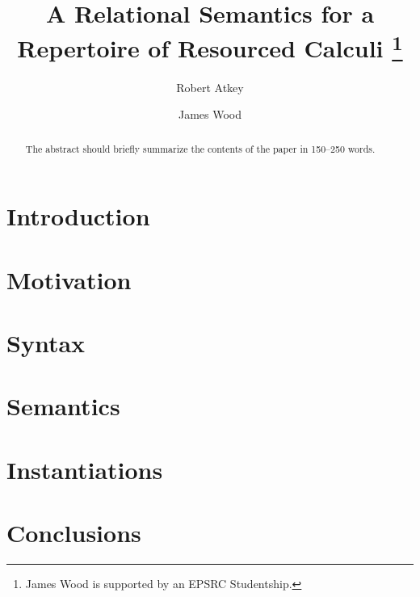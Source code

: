 \documentclass[runningheads]{llncs}
\begin{document}
%
\title{A Relational Semantics for a Repertoire of Resourced Calculi
  \thanks{James Wood is supported by an EPSRC Studentship.}}
%
%
\author{Robert Atkey \and
  James Wood}
%
%
%
\maketitle              %
%
\begin{abstract}
The abstract should briefly summarize the contents of the paper in
150--250 words.

\end{abstract}

\section{Introduction}
\label{sec:introduction}


\section{Motivation}
\label{sec:motivation}


\section{Syntax}
\label{sec:syntax}


\section{Semantics}
\label{sec:semantics}


\section{Instantiations}
\label{sec:instantiations}


\section{Conclusions}
\label{sec:future-work}

%
%



\end{document}
